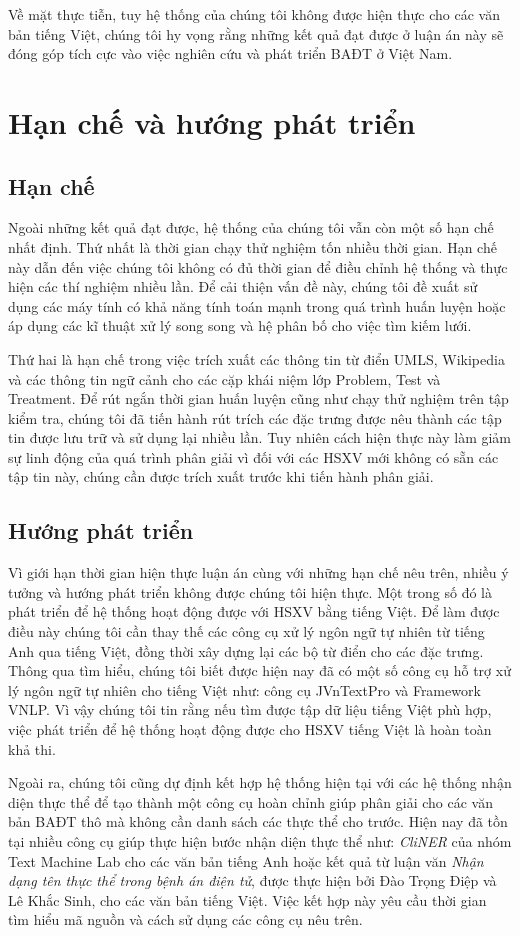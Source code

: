 Về mặt thực tiễn, tuy hệ thống của chúng tôi không được hiện thực cho các văn bản tiếng Việt, chúng tôi hy vọng rằng những kết quả đạt được ở luận án này sẽ đóng góp tích cực vào việc nghiên cứu và phát triển BAĐT ở Việt Nam.

\section{Hạn chế và hướng phát triển}
\subsection*{Hạn chế}
Ngoài những kết quả đạt được, hệ thống của chúng tôi vẫn còn một số hạn chế nhất định. Thứ nhất là thời gian chạy thử nghiệm tốn nhiều thời gian. Hạn chế này dẫn đến việc chúng tôi không có đủ thời gian để điều chỉnh hệ thống và thực hiện các thí nghiệm nhiều lần. Để cải thiện vấn đề này, chúng tôi đề xuất sử dụng các máy tính có khả năng tính toán mạnh trong quá trình huấn luyện hoặc áp dụng các kĩ thuật xử lý song song và hệ phân bố cho việc tìm kiếm lưới.

Thứ hai là hạn chế trong việc trích xuất các thông tin từ điển UMLS, Wikipedia và các thông tin ngữ cảnh cho các cặp khái niệm lớp Problem, Test và Treatment. Để rút ngắn thời gian huấn luyện cũng như chạy thử nghiệm trên tập kiểm tra, chúng tôi đã tiến hành rút trích các đặc trưng được nêu thành các tập tin được lưu trữ và sử dụng lại nhiều lần. Tuy nhiên cách hiện thực này làm giảm sự linh động của quá trình phân giải vì đối với các HSXV mới không có sẵn các tập tin này, chúng cần được trích xuất trước khi tiến hành phân giải.

\subsection*{Hướng phát triển}
Vì giới hạn thời gian hiện thực luận án cùng với những hạn chế nêu trên, nhiều ý tưởng và hướng phát triển không được chúng tôi hiện thực. Một trong số đó là phát triển để hệ thống hoạt động được với HSXV bằng tiếng Việt. Để làm được điều này chúng tôi cần thay thế các công cụ xử lý ngôn ngữ tự nhiên từ tiếng Anh qua tiếng Việt, đồng thời xây dựng lại các bộ từ điển cho các đặc trưng. Thông qua tìm hiểu, chúng tôi biết được hiện nay đã có một số công cụ hỗ trợ xử lý ngôn ngữ tự nhiên cho tiếng Việt như: công cụ JVnTextPro và Framework VNLP. Vì vậy chúng tôi tin rằng nếu tìm được tập dữ liệu tiếng Việt phù hợp, việc phát triển để hệ thống hoạt động được cho HSXV tiếng Việt là hoàn toàn khả thi.

Ngoài ra, chúng tôi cũng dự định kết hợp hệ thống hiện tại với các hệ thống nhận diện thực thể để tạo thành một công cụ hoàn chỉnh giúp phân giải cho các văn bản BAĐT thô mà không cần danh sách các thực thể cho trước. Hiện nay đã tồn tại nhiều công cụ giúp thực hiện bước nhận diện thực thể như: \textit{CliNER} của nhóm Text Machine Lab cho các văn bản tiếng Anh hoặc kết quả từ luận văn \textit{Nhận dạng tên thực thể trong bệnh án điện tử}, được thực hiện bởi Đào Trọng Điệp và Lê Khắc Sinh, cho các văn bản tiếng Việt. Việc kết hợp này yêu cầu thời gian tìm hiểu mã nguồn và cách sử dụng các công cụ nêu trên.

